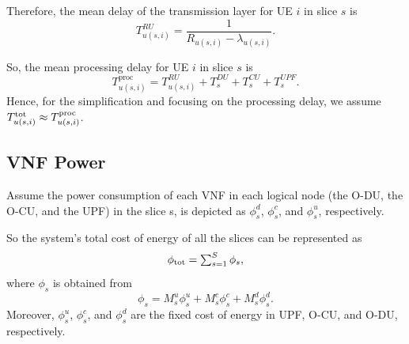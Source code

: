 \documentclass[conference]{IEEEtran}
\begin{document}
Therefore, the mean delay of the transmission layer for UE $i$ in slice $s$ is
\begin{equation}
 T_{u(s,i)}^{RU} = \frac{1}{R_{u(s,i)} - \lambda_{u(s,i)}}.
\end{equation}

So, the mean processing delay for UE $i$ in slice $s$ is 
\begin{equation}
T^{\text{proc}}_{u(s,i)} =  T^{RU}_{u(s,i)} + T^{DU}_{s} + T^{CU}_{s} + T^{UPF}_{s}.
\end{equation}
Hence, for the simplification and focusing on the processing delay, we assume $T^{\text{\text{tot}}}_{u(s,i)} \approx T^{\text{proc}}_{u(s,i)} $. %
\subsection{VNF Power}
Assume the power consumption of each VNF in each logical node (the O-DU, the O-CU, and the UPF) in the slice s, is depicted as $\phi_{s}^d$, $\phi_{s}^c$, and $\phi_{s}^u$, respectively. 

So the system's total cost of energy of all the slices can be represented as
\begin{equation*}
\textstyle \phi_{\text{\text{tot}}} = \sum_{s=1}^{S}\phi_{s},
\end{equation*}
where $\phi_{s}$ is obtained from
\begin{equation}
\phi_{s} = M_s^u \phi_s^u + M_s^c \phi_s^c+ M_s^d \phi_s^d.
\end{equation}
Moreover, $\phi_s^u$, $\phi_s^c$, and $\phi_s^d$ are the fixed cost of energy in UPF, O-CU, and O-DU, respectively. 
\end{document}
